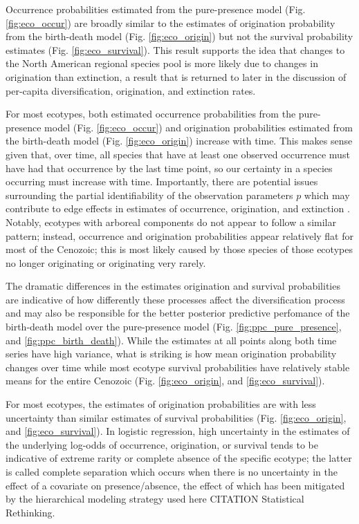 \documentclass[12pt,letterpaper]{article}
\begin{document}
Occurrence probabilities estimated from the pure-presence model (Fig. \ref{fig:eco_occur}) are broadly similar to the estimates of origination probability from the birth-death model (Fig. \ref{fig:eco_origin}) but not the survival probability estimates (Fig. \ref{fig:eco_survival}). This result supports the idea that changes to the North American regional species pool is more likely due to changes in origination than extinction, a result that is returned to later in the discussion of per-capita diversification, origination, and extinction rates.

For most ecotypes, both estimated occurrence probabilities from the pure-presence model (Fig. \ref{fig:eco_occur}) and origination probabilities estimated from the birth-death model (Fig. \ref{fig:eco_origin}) increase with time. This makes sense given that, over time, all species that have at least one observed occurrence must have had that occurrence by the last time point, so our certainty in a species occurring must increase with time. Importantly, there are potential issues surrounding the partial identifiability of the observation parameters \(p\) which may contribute to edge effects in estimates of occurrence, origination, and extinction \citep{Royle2008}. Notably, ecotypes with arboreal components do not appear to follow a similar pattern; instead, occurrence and origination probabilities appear relatively flat for most of the Cenozoic; this is most likely caused by those species of those ecotypes no longer originating or originating very rarely.

The dramatic differences in the estimates origination and survival probabilities are indicative of how differently these processes affect the diversification process and may also be responsible for the better posterior predictive perfomance of the birth-death model over the pure-presence model (Fig. \ref{fig:ppc_pure_presence}, and \ref{fig:ppc_birth_death}). While the estimates at all points along both time series have high variance, what is striking is how mean origination probability changes over time while most ecotype survival probabilities have relatively stable means for the entire Cenozoic (Fig. \ref{fig:eco_origin}, and \ref{fig:eco_survival}).

For most ecotypes, the estimates of origination probabilities are with less uncertainty than similar estimates of survival probabilities (Fig. \ref{fig:eco_origin}, and \ref{fig:eco_survival}). In logistic regression, high uncertainty in the estimates of the underlying log-odds of occurrence, origination, or survival tends to be indicative of extreme rarity or complete absence of the specific ecotype; the latter is called complete separation which occurs when there is no uncertainty in the effect of a covariate on presence/absence, the effect of which has been mitigated by the hierarchical modeling strategy used here \citep{Gelman2013d,Gelman2007} CITATION Statistical Rethinking.
\end{document}
